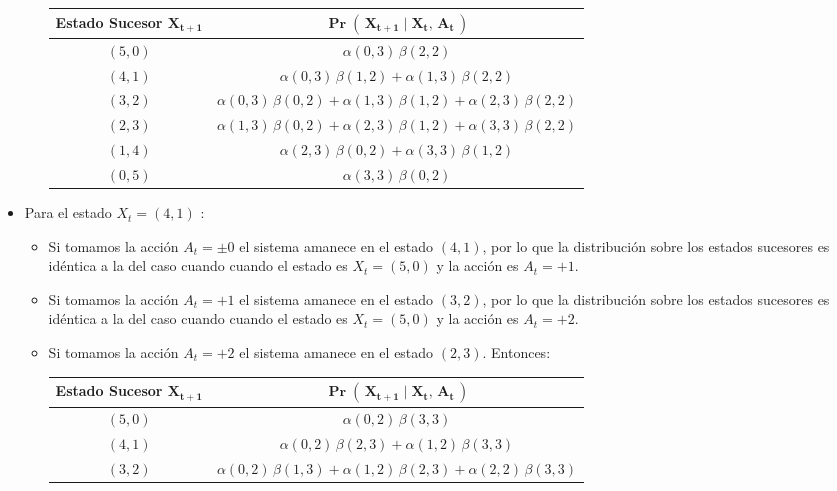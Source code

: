 \documentclass[ a4paper, twoside, 11pt]{article}
\begin{document}
\begin{problem}
\begin{itemize}
\begin{itemize}
\begin{table}[H]
\centering
\begin{tabular}{|c|c|}
\hline
\textbf{Estado Sucesor} $\boldsymbol{X_{t+1}}$
& $\boldsymbol{\Pr( \, X_{t+1} \mid X_t, \, A_t \, )}$ \\ \hline
$(5,0)$ & $\alpha(0,3) \, \beta(2,2)$ \\ \hline
$(4,1)$ & $\alpha(0,3) \, \beta(1,2) + \alpha(1,3) \, \beta(2,2)$ \\ \hline
$(3,2)$ & $\alpha(0,3) \, \beta(0,2) + \alpha(1,3) \, \beta(1,2) + \alpha(2,3) \, \beta(2,2)$ \\ \hline
$(2,3)$ & $\alpha(1,3) \, \beta(0,2) + \alpha(2,3) \, \beta(1,2) + \alpha(3,3) \, \beta(2,2)$ \\ \hline
$(1,4)$ & $\alpha(2,3) \, \beta(0,2) + \alpha(3,3) \, \beta(1,2)$ \\ \hline
$(0,5)$ & $\alpha(3,3) \, \beta(0,2)$ \\ \hline
\end{tabular}
\end{table}
\end{itemize}
\item Para el estado $X_t = (4,1)$ :
\begin{itemize}
\item Si tomamos la acci\'on $A_t = \pm 0$ el sistema amanece en el estado $(4,1)$, por lo que la distribuci\'on sobre los estados sucesores es id\'entica a la del caso cuando cuando el estado es $X_t = (5,0)$ y la acci\'on es $A_t = +1$. 
\item Si tomamos la acci\'on $A_t = +1$ el sistema amanece en el estado $(3,2)$, por lo que la distribuci\'on sobre los estados sucesores es id\'entica a la del caso cuando cuando el estado es $X_t = (5,0)$ y la acci\'on es $A_t = +2$. 
\item Si tomamos la acci\'on $A_t = +2$ el sistema amanece en el estado $(2,3)$. Entonces: 
\begin{table}[H]
\centering
\begin{tabular}{|c|c|}
\hline
\textbf{Estado Sucesor} $\boldsymbol{X_{t+1}}$
& $\boldsymbol{\Pr( \, X_{t+1} \mid X_t, \, A_t \, )}$ \\ \hline
$(5,0)$ & $\alpha(0,2) \, \beta(3,3)$ \\ \hline
$(4,1)$ & $\alpha(0,2) \, \beta(2,3) + \alpha(1,2) \, \beta(3,3)$ \\ \hline
$(3,2)$ & $\alpha(0,2) \, \beta(1,3) + \alpha(1,2) \, \beta(2,3) + \alpha(2,2) \, \beta(3,3)$ \\ \hline

\end{tabular}
\end{table}
\end{itemize}
\end{itemize}
\end{problem}
\end{document}
